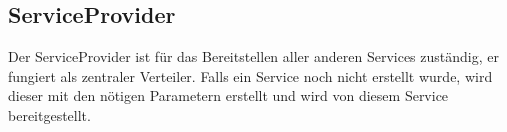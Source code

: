 \subsection{ServiceProvider}
Der ServiceProvider ist für das Bereitstellen aller anderen Services zuständig,
er fungiert als zentraler Verteiler.
Falls ein Service noch nicht erstellt wurde, wird dieser mit den nötigen Parametern erstellt
und wird von diesem Service bereitgestellt.
